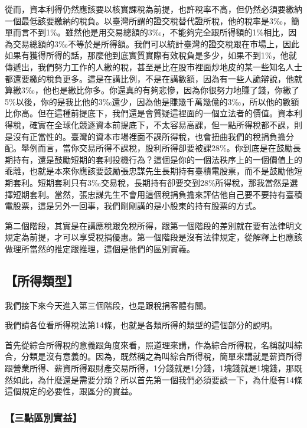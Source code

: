 \documentclass[oneside,sub3section]{ctexbook}
\begin{document}
從而，資本利得仍然應該要以核實課稅為前提，也許稅率不高，但仍然必須要繳納一個最低該要繳納的稅負。以臺灣所謂的證交稅替代證所稅，他的稅率是3‰，簡單而言不到1\%。雖然他是用交易總額的3‰，不能夠完全跟所得額的1\%相比，因為交易總額的3‰不等於是所得額。我們可以統計臺灣的證交稅跟在市場上，因此如果有獲得所得的話，那麼他到底實質實際有效稅負是多少，如果不到1\%，他就傳遞出，我們努力工作的人繳的稅，甚至是比在股市裡面炒地皮的某一些知名人士都還要繳的稅負更多。這是在講比例，不是在講數額，因為有一些人詭辯說，他就算繳3‰，他也是繳比你多。你還真的有夠悲慘，因為你很努力地賺了錢，你繳了5\%以後，你的是我比他的3‰還少，因為他是賺幾千萬幾億的3‰，所以他的數額比你高。但在這種前提底下，我們還是會質疑這裡面的一個立法者的價值。資本利得稅，確實在全球化競逐資本前提底下，不太容易高課，但一點所得稅都不課，則是沒有正當性的。臺灣的資本市場裡面不課所得稅，也會扭曲我們的稅捐負擔分配。舉例而言，當你交易所得不課稅，股利所得卻要被課28\%。你到底是在鼓勵長期持有，還是鼓勵短期的套利投機行為？這個是你的一個法秩序上的一個價值上的乖離，也就是本來你應該要鼓勵張忠謀先生長期持有臺積電股票，而不是鼓勵他短期套利。短期套利只有3‰交易稅，長期持有卻要交到28\%所得稅，那我當然是選擇短期套利。當然，張忠謀先生不會用這個稅捐負擔來評估他自己要不要持有臺積電股票，這是另外一回事，我們剛剛講的是小股東的持有股票的方式。

第二個階段，其實是在講應稅跟免稅所得，跟第一個階段的差別就在要有法律明文規定為前提，才可以享受稅捐優惠。第一個階段是沒有法律規定，從解釋上也應該做理所當然的推定跟推理，這個是他們的區別實義。

\hypertarget{ux6240ux5f97ux985eux578b}{%
\subsection{【所得類型】}\label{ux6240ux5f97ux985eux578b}}

我們接下來今天進入第三個階段，也是跟稅捐客體有關。

我們請各位看所得稅法第14條，也就是各類所得的類型的這個部分的說明。

首先從綜合所得稅的意義跟角度來看，照道理來講，作為綜合所得稅，名稱就叫綜合，分類是沒有意義的。因為，既然稱之為叫綜合所得稅，簡單來講就是薪資所得跟營業所得、薪資所得跟財產交易所得，1分錢就是1分錢，1塊錢就是1塊錢，那既然如此，為什麼還是需要分類？所以首先第一個我們必須要談一下，為什麼有14條這個規定的必要性，跟區分的實益。

\hypertarget{ux4e09ux9edeux5340ux5225ux5be6ux76ca}{%
\subsubsection{【三點區別實益】}\label{ux4e09ux9edeux5340ux5225ux5be6ux76ca}}
\end{document}
